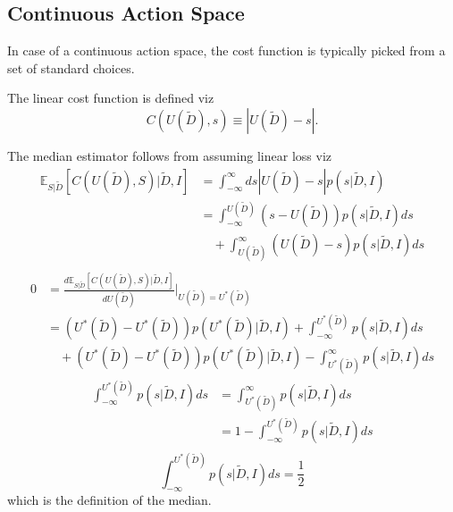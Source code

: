 \subsection{Continuous Action Space}
In case of a continuous action space, the cost function is typically picked from a set of standard choices.	
\begin{definition}
	\label{def:linear_cost_function}
	The linear cost function is defined viz
	\begin{equation}
		C(U(\tilde{D}),s) \equiv |U(\tilde{D})-s|.
	\end{equation}
	
\end{definition}
\begin{theorem}
	The median estimator follows from assuming linear loss viz
	\begin{equation}
		\begin{split}
			\mathbb{E}_{S|\tilde{D}}[C(U(\tilde{D}), S)|\tilde{D},I] &= \int_{-\infty}^{\infty} ds |U(\tilde{D})-s| p(s|\tilde{D},I)\\
			&= \int_{-\infty}^{U(\tilde{D})} (s-U(\tilde{D}))p(s|\tilde{D},I)ds\\
			&\quad+\int_{U(\tilde{D})}^\infty (U(\tilde{D})-s)p(s|\tilde{D},I)ds\\
		\end{split}
	\end{equation}
	\begin{equation}
		\begin{split}
			0 &=\frac{d \mathbb{E}_{S|\tilde{D}}[C(U(\tilde{D}), S)|\tilde{D},I]}{dU(\tilde{D})}\bigg|_{U(\tilde{D})=U^*(\tilde{D})}\\
			&= (U^*(\tilde{D})-U^*(\tilde{D}))p(U^*(\tilde{D})|\tilde{D},I)+\int_{-\infty}^{U^*(\tilde{D})} p(s|\tilde{D},I)ds\\
			&\quad+(U^*(\tilde{D})-U^*(\tilde{D}))p(U^*(\tilde{D})|\tilde{D},I)-\int_{U^*(\tilde{D})}^\infty p(s|\tilde{D},I)ds
		\end{split}
	\end{equation}
	\begin{equation}
		\begin{split}
			\int_{-\infty}^{U^*(\tilde{D})} p(s|\tilde{D},I)ds &= \int_{U^*(\tilde{D})}^\infty p(s|\tilde{D},I)ds\\
			&= 1- \int_{-\infty}^{U^*(\tilde{D})} p(s|\tilde{D},I)ds\\
		\end{split}
	\end{equation}
	\begin{equation}
		\int_{-\infty}^{U^*(\tilde{D})} p(s|\tilde{D},I)ds = \frac{1}{2}
	\end{equation}
	which is the definition of the median.
\end{theorem}


